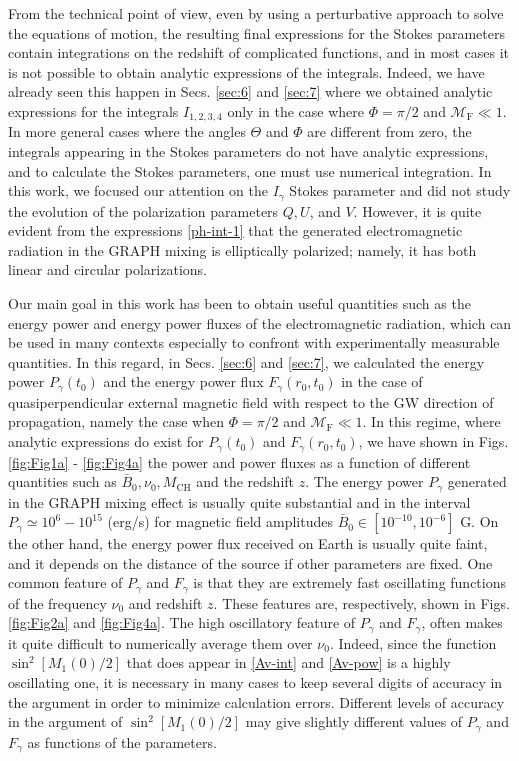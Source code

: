 \documentclass[a4paper,11pt]{article}
\begin{document}
From the technical point of view, even by using a perturbative approach to solve the equations of motion, the resulting final expressions for the Stokes parameters contain integrations on the redshift of complicated functions, and in most cases it is not possible to obtain analytic expressions of the integrals. Indeed, we have already seen this happen in Secs. \ref{sec:6} and \ref{sec:7} where we obtained analytic expressions for the integrals $I_{1, 2, 3, 4}$ only in the case where $\Phi=\pi/2$ and $\mathcal M_\text{F}\ll 1$. In more general cases where the angles $\Theta$ and $\Phi$ are different from zero, the integrals appearing in the Stokes parameters do not have analytic expressions, and to calculate the Stokes parameters, one must use numerical integration. In this work, we focused our attention on the $I_\gamma$ Stokes parameter and did not study the evolution of the polarization parameters $Q, U$, and $V$. However, it is quite evident from the expressions \eqref{ph-int-1} that the generated electromagnetic radiation in the GRAPH mixing is elliptically polarized; namely, it has both linear and circular polarizations.  

Our main goal in this work has been to obtain useful quantities such as the energy power and energy power fluxes of the electromagnetic radiation, which can be used in many contexts especially to confront with experimentally measurable quantities. In this regard, in Secs. \ref{sec:6} and \ref{sec:7}, we calculated the energy power $P_\gamma(t_0)$ and the energy power flux $F_\gamma(r_0, t_0)$ in the case of quasiperpendicular external magnetic field with respect to the GW direction of propagation, namely the case when $\Phi=\pi/2$ and $\mathcal M_\text{F}\ll 1$. In this regime, where analytic expressions do exist for $P_\gamma(t_0)$ and $F_\gamma(r_0, t_0)$, we have shown in Figs. \ref{fig:Fig1a} - \ref{fig:Fig4a} the power and power fluxes as a function of different quantities such as $\bar B_0, \nu_0, M_\text{CH}$ and the redshift $z$. The energy power $P_\gamma$ generated in the GRAPH mixing effect is usually quite substantial and in the interval $P_\gamma \simeq 10^6 - 10^{15}$ (erg/s) for magnetic field amplitudes $\bar B_0\in [10^{-10}, 10^{-6}]$ G. On the other hand, the energy power flux received on Earth is usually quite faint, and it depends on the distance of the source if other parameters are fixed. One common feature of $P_\gamma$ and $F_\gamma$ is that they are extremely fast oscillating functions of the frequency $\nu_0$ and redshift $z$. These features are, respectively, shown in Figs. \ref{fig:Fig2a} and \ref{fig:Fig4a}. The high oscillatory feature of $P_\gamma$ and $F_\gamma$, often makes it quite difficult to numerically average them over $\nu_0$. Indeed, since the function $\sin^2[M_1(0)/2]$ that does appear in \eqref{Av-int} and \eqref{Av-pow} is a highly oscillating one, it is necessary in many cases to keep several digits of accuracy in the argument in order to minimize calculation errors. Different levels of accuracy in the argument of $\sin^2[M_1(0)/2]$ may give slightly different values of $P_\gamma$ and $F_\gamma$ as functions of the parameters.
\end{document}
